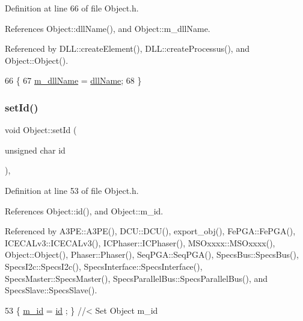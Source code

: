 Definition at line 66 of file Object.\+h.



References Object\+::dll\+Name(), and Object\+::m\+\_\+dll\+Name.



Referenced by D\+L\+L\+::create\+Element(), D\+L\+L\+::create\+Processus(), and Object\+::\+Object().


\begin{DoxyCode}
66                                       \{
67     \hyperlink{classObject_a01afbeacebb8db6831559972ec362eb3}{m\_dllName} = \hyperlink{classObject_a2e3947f2870094c332d7454117f3ec63}{dllName};
68   \}
\end{DoxyCode}
\mbox{\label{classObject_a398fe08cba594a0ce6891d59fe4f159f}} 
\subsubsection{\texorpdfstring{set\+Id()}{setId()}}
{\footnotesize\ttfamily void Object\+::set\+Id (\begin{DoxyParamCaption}\item[{unsigned char}]{id }\end{DoxyParamCaption})\hspace{0.3cm}{\ttfamily [inline]}, {\ttfamily [inherited]}}



Definition at line 53 of file Object.\+h.



References Object\+::id(), and Object\+::m\+\_\+id.



Referenced by A3\+P\+E\+::\+A3\+P\+E(), D\+C\+U\+::\+D\+C\+U(), export\+\_\+obj(), Fe\+P\+G\+A\+::\+Fe\+P\+G\+A(), I\+C\+E\+C\+A\+Lv3\+::\+I\+C\+E\+C\+A\+Lv3(), I\+C\+Phaser\+::\+I\+C\+Phaser(), M\+S\+Oxxxx\+::\+M\+S\+Oxxxx(), Object\+::\+Object(), Phaser\+::\+Phaser(), Seq\+P\+G\+A\+::\+Seq\+P\+G\+A(), Specs\+Bus\+::\+Specs\+Bus(), Specs\+I2c\+::\+Specs\+I2c(), Specs\+Interface\+::\+Specs\+Interface(), Specs\+Master\+::\+Specs\+Master(), Specs\+Parallel\+Bus\+::\+Specs\+Parallel\+Bus(), and Specs\+Slave\+::\+Specs\+Slave().


\begin{DoxyCode}
53 \{ \hyperlink{classObject_aca74b9dbfed7b5556ea2d56c65b6b6b0}{m\_id}    = \hyperlink{classObject_af99145335cc61ff6e2798ea17db009d2}{id}    ; \} \textcolor{comment}{//< Set Object m\_id}
\end{DoxyCode}
\mbox{\label{classObject_ae30fea75683c2d149b6b6d17c09ecd0c}} 
